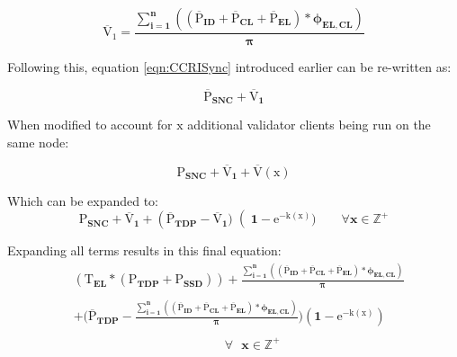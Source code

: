 \begin{equation*}
    \boldsymbol{\mathrm{\overline{V}_{1}} = {\frac{\displaystyle\sum\limits_{i=1}^{n}{ \left({\left(\mathrm{\overline{P}}_{ID} + \mathrm{\overline{P}}_{CL} + \mathrm{\overline{P}}_{EL}\right)} * {\phi_{EL,CL}} \right)}}
{\pi}} }
\end{equation*}

Following this, equation \ref{eqn:CCRISync} introduced earlier can be re-written as:

\begin{equation*}
     \boldsymbol{\overline{\mathrm{P}}_{SNC} +  \overline{\mathrm{V}}_{1} 
} 
\end{equation*}

When modified to account for $\boldsymbol{\mathrm{x }}$ additional validator clients being run on the same node: 

\begin{equation*}
     \boldsymbol{\mathrm{P}_{SNC} +  \overline{\mathrm{V}}_{1} + \mathrm{\overline{V}(\mathrm{x})}} 
\end{equation*}

Which can be expanded to:
\begin{equation}
    \label{eqn:FinalEqnShort}
     \boldsymbol{\mathrm{P}_{SNC} +  \overline{\mathrm{V}}_{1} + {\left(\mathrm{\overline{P}}_{TDP} -\overline{\mathrm{V}}_{1} )\right(1-\mathrm{e}^{-\mathrm{k}(\mathrm{x})}) \qquad \forall x \in \mathbb{Z}^+}} 
\end{equation}

Expanding all terms results in this final equation:
\begin{align}
\label{eqn:FinalEqnLong}
     &\boldsymbol{({\mathrm{T}_{EL} * ({\mathrm{P}_{TDP}} + \mathrm{P}_{SSD})}) +  {\frac{\displaystyle\sum\limits_{i=1}^{n}{ \left({\left(\mathrm{\overline{P}}_{ID} + \mathrm{\overline{P}}_{CL} + \mathrm{\overline{P}}_{EL}\right)} * {\phi_{EL,CL}} \right)}}
{\pi}}}\nonumber \\  \nonumber\\  
     &\boldsymbol{+ {(\mathrm{\overline{P}}_{TDP} - {\frac{\displaystyle\sum\limits_{i=1}^{n}{ \left({\left(\mathrm{\overline{P}}_{ID} + \mathrm{\overline{P}}_{CL} + \mathrm{\overline{P}}_{EL}\right)} * {\phi_{EL,CL}} \right)}}
{\pi}}} ) (1-\mathrm{e}^{-\mathrm{k}(\mathrm{x})})}\\ \nonumber \\    
     &\boldsymbol{\qquad \qquad \qquad \qquad \qquad \qquad \forall \text{ } x \in \mathbb{Z}^+}\nonumber 
\end{align}

